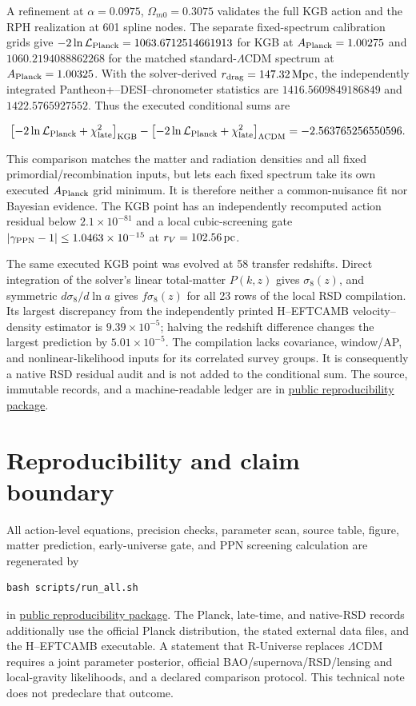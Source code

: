 \documentclass[11pt,a4paper]{article}
\newcommand{\repo}{\href{https://github.com/MartinPetrasek123/MartinPetrasek123/tree/main/r-universe-global-kgb-completion}{public reproducibility package}}
\begin{document}
A refinement at $\alpha=0.0975$, $\Omega_{m0}=0.3075$ validates the full KGB
action and the RPH realization at 601 spline nodes. The separate fixed-spectrum
calibration grids give $-2\ln\mathcal L_{\rm Planck}=1063.6712514661913$ for
KGB at $A_{\rm Planck}=1.00275$ and $1060.2194088862268$ for the matched
standard-$\Lambda$CDM spectrum at $A_{\rm Planck}=1.00325$. With the
solver-derived $r_{\rm drag}=147.32\,{\rm Mpc}$, the independently integrated
Pantheon+--DESI--chronometer statistics are $1416.5609849186849$ and
$1422.5765927552$. Thus the executed conditional sums are

\begin{equation}
\left[-2\ln\mathcal L_{\rm Planck}+\chi^2_{\rm late}\right]_{\rm KGB}
-\left[-2\ln\mathcal L_{\rm Planck}+\chi^2_{\rm late}\right]_{\Lambda{\rm CDM}}
=-2.563765256550596.
\end{equation}

This comparison matches the matter and radiation densities and all fixed
primordial/recombination inputs, but lets each fixed spectrum take its own
executed $A_{\rm Planck}$ grid minimum. It is therefore neither a common-nuisance
fit nor Bayesian evidence. The KGB point has an independently recomputed
action residual below $2.1\times10^{-81}$ and a local cubic-screening gate
$|\gamma_{\rm PPN}-1|\le1.0463\times10^{-15}$ at $r_V=102.56\,{\rm pc}$.

The same executed KGB point was evolved at 58 transfer redshifts. Direct
integration of the solver's linear total-matter $P(k,z)$ gives $\sigma_8(z)$,
and symmetric $d\sigma_8/d\ln a$ gives $f\sigma_8(z)$ for all 23 rows of the
local RSD compilation. Its largest discrepancy from the independently printed
H--EFTCAMB velocity--density estimator is $9.39\times10^{-5}$; halving the
redshift difference changes the largest prediction by $5.01\times10^{-5}$.
The compilation lacks covariance, window/AP, and nonlinear-likelihood inputs
for its correlated survey groups. It is consequently a native RSD residual
audit and is not added to the conditional sum. The source, immutable records,
and a machine-readable ledger are in \repo.

\section{Reproducibility and claim boundary}

All action-level equations, precision checks, parameter scan, source table, figure, matter prediction, early-universe gate, and PPN screening calculation are regenerated by
\begin{verbatim}
bash scripts/run_all.sh
\end{verbatim}
in \repo. The Planck, late-time, and native-RSD records additionally use the
official Planck distribution, the stated external data files, and the
H--EFTCAMB executable. A statement that R-Universe replaces $\Lambda$CDM
requires a joint parameter posterior, official BAO/supernova/RSD/lensing and
local-gravity likelihoods, and a declared comparison protocol. This technical
note does not predeclare that outcome.
\end{document}

